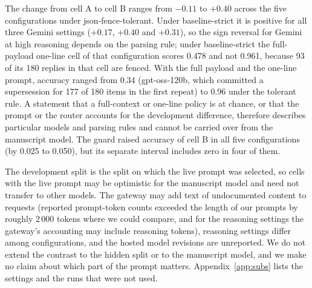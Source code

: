 The change from cell A to cell B ranges from $-0.11$ to $+0.40$ across the five configurations under json-fence-tolerant. Under baseline-strict it is positive for all three Gemini settings ($+0.17$, $+0.40$ and $+0.31$), so the sign reversal for Gemini at high reasoning depends on the parsing rule; under baseline-strict the full-payload one-line cell of that configuration scores 0.478 and not 0.961, because 93 of its 180 replies in that cell are fenced. With the full payload and the one-line prompt, accuracy ranged from 0.34 (gpt-oss-120b, which committed a supersession for 177 of 180 items in the first repeat) to 0.96 under the tolerant rule. A statement that a full-context or one-line policy is at chance, or that the prompt or the router accounts for the development difference, therefore describes particular models and parsing rules and cannot be carried over from the manuscript model. The guard raised accuracy of cell B in all five configurations (by 0.025 to 0.050), but its separate interval includes zero in four of them.

The development split is the split on which the live prompt was selected, so cells with the live prompt may be optimistic for the manuscript model and need not transfer to other models. The gateway may add text of undocumented content to requests (reported prompt-token counts exceeded the length of our prompts by roughly 2\,000 tokens where we could compare, and for the reasoning settings the gateway's accounting may include reasoning tokens), reasoning settings differ among configurations, and the hosted model revisions are unreported. We do not extend the contrast to the hidden split or to the manuscript model, and we make no claim about which part of the prompt matters. Appendix~\ref{app:subs} lists the settings and the runs that were not used.

\begin{table}[t]
\centering\footnotesize\setlength{\tabcolsep}{4pt}
\caption{Accuracy on the 180 public development items under json-fence-tolerant parsing (mean of two repeats; one repeat for Gemini at high reasoning). A: payload, one-line prompt; D: routed pair, one-line prompt; E: payload, live prompt; B: routed pair, live prompt; B+g: B after the repository's guard. Gemini rows are Gemini 3.8 Flash at the named reasoning setting; gpt-oss-120b is at medium reasoning. Substitute models; not comparable with Table~\ref{tab:dev}.}
\label{tab:models-acc}

\end{table}

